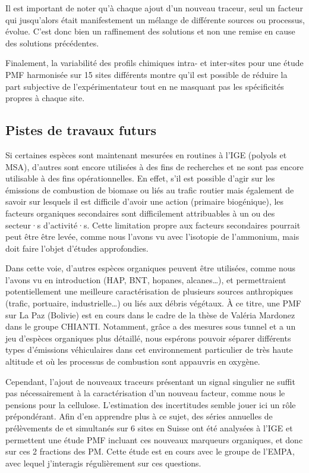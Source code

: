 Il est important de noter qu'à chaque ajout d'un nouveau traceur, seul un facteur qui
jusqu'alors était manifestement un mélange de différente sources ou processus, évolue.
C'est donc bien un raffinement des solutions et non une remise en cause des solutions
précédentes.

Finalement, la variabilité des profils chimiques intra- et inter-sites pour une étude
PMF harmonisée sur 15 sites différents montre qu'il est possible de réduire la part
subjective de l'expérimentateur tout en ne masquant pas les spécificités propres à chaque
site.

\subsection{Pistes de travaux futurs}%
\label{sub:pistes_de_travaux_futurs}

Si certaines espèces sont maintenant mesurées en routines à l'IGE (polyols et MSA),
d'autres sont encore utilisées à des fins de recherches et ne sont pas encore utilisable
à des fins opérationnelles. En effet, s'il est possible d'agir sur les émissions de
combustion de biomase ou liés au trafic routier mais également de savoir sur lesquels il
est difficile d'avoir une action (primaire biogénique), les facteurs organiques
secondaires sont difficilement attribuables à un ou des secteur·s d'activité·s. Cette
limitation propre aux facteurs secondaires pourrait peut être être levée, comme nous
l'avons vu avec l'isotopie de l'ammonium, mais doit faire l'objet d'études approfondies.

Dans cette voie, d'autres espèces organiques peuvent être utilisées, comme nous l'avons
vu en introduction (HAP, BNT, hopanes, alcanes…), et permettraient potentiellement une
meilleure caractérisation de plusieurs sources anthropiques (trafic, portuaire,
industrielle…) ou liés aux débris végétaux.  À ce titre, une PMF sur La Paz (Bolivie) est
en cours dans le cadre de la thèse de Valéria Mardonez dans le groupe CHIANTI.
Notamment, grâce a des mesures sous tunnel et a un jeu d'espèces organiques plus
détaillé, nous espérons pouvoir séparer différents types d'émissions véhiculaires dans
cet environnement particulier de très haute altitude et où les processus de combustion
sont appauvris en oxygène.

Cependant, l'ajout de nouveaux traceurs présentant un signal singulier ne suffit pas
nécessairement à la caractérisation d'un nouveau facteur, comme nous le pensions pour la
cellulose. L'estimation des incertitudes semble jouer ici un rôle prépondérant.  Afin
d'en apprendre plus à ce sujet, des séries annuelles de prélèvements de \PMdix{} et
\PMdc{} simultanés sur 6 sites en Suisse ont été analysées à l'IGE et permettent une
étude PMF incluant ces nouveaux marqueurs organiques, et donc sur ces 2 fractions des PM.
Cette étude est en cours avec le groupe de l'EMPA, avec lequel j'interagis régulièrement
sur ces questions.

